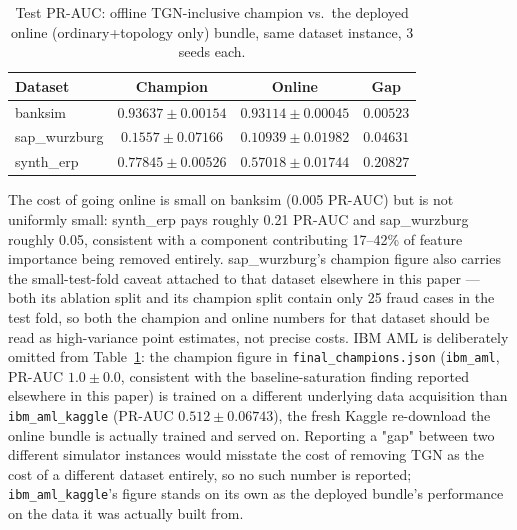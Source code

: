\begin{table}[t]
  \centering
  \small
  \caption{Test PR-AUC: offline TGN-inclusive champion vs.\ the deployed online (ordinary+topology only) bundle, same dataset instance, 3 seeds each.}
  \label{tab:online-gap}
  \begin{tabular}{lccc}
    \toprule
    Dataset & Champion & Online & Gap \\
    \midrule
    banksim      & $0.93637 \pm 0.00154$ & $0.93114 \pm 0.00045$ & $0.00523$ \\
    sap\_wurzburg & $0.1557 \pm 0.07166$  & $0.10939 \pm 0.01982$ & $0.04631$ \\
    synth\_erp    & $0.77845 \pm 0.00526$ & $0.57018 \pm 0.01744$ & $0.20827$ \\
    \bottomrule
  \end{tabular}
\end{table}

The cost of going online is small on banksim (0.005 PR-AUC) but is not uniformly small: synth\_erp pays roughly 0.21 PR-AUC and sap\_wurzburg roughly 0.05, consistent with a component contributing 17--42\% of feature importance being removed entirely. sap\_wurzburg's champion figure also carries the small-test-fold caveat attached to that dataset elsewhere in this paper — both its ablation split and its champion split contain only 25 fraud cases in the test fold, so both the champion and online numbers for that dataset should be read as high-variance point estimates, not precise costs. IBM AML is deliberately omitted from Table~\ref{tab:online-gap}: the champion figure in \texttt{final\_champions.json} (\texttt{ibm\_aml}, PR-AUC $1.0\pm0.0$, consistent with the baseline-saturation finding reported elsewhere in this paper) is trained on a different underlying data acquisition than \texttt{ibm\_aml\_kaggle} (PR-AUC $0.512\pm0.06743$), the fresh Kaggle re-download the online bundle is actually trained and served on. Reporting a "gap" between two different simulator instances would misstate the cost of removing TGN as the cost of a different dataset entirely, so no such number is reported; \texttt{ibm\_aml\_kaggle}'s figure stands on its own as the deployed bundle's performance on the data it was actually built from.

